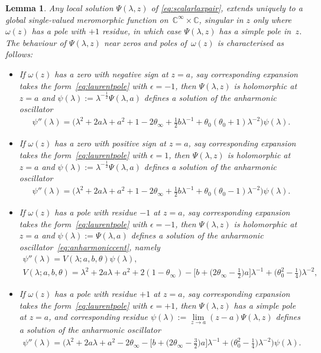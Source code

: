 \documentclass[pdftex]{sigma}
\numberwithin{equation}{section}
\newtheorem{lem}[thm]{Lemma}
\newcommand{\om}{\omega}
\begin{document}
\begin{lem}\label{lem:behavioursolutions}
Any local solution $\Psi(\lambda,z)$ of \eqref{eq:scalarlaxpair}, extends uniquely to a global single-valued meromorphic function on~$\mathbb{C}^\infty\times \mathbb{C}$, singular in $z$ only where $\om(z)$ has a pole with $+1$ residue, in which case $\Psi(\lambda,z)$ has a simple pole in~$z$. The behaviour of $\Psi(\lambda,z)$ near zeros and poles of~$\om(z)$ is characterised as follows:
	\begin{itemize}\itemsep=0pt
		\item 	If $\om(z)$ has a zero with negative sign at $z=a$, say corresponding expansion takes the form~\eqref{eq:laurentpole} with $\epsilon=-1$, then $\Psi(\lambda,z)$ is holomorphic at $z=a$ and	$\psi(\lambda):=\lambda^{-\frac{1}{2}}\Psi(\lambda,a)$
defines a solution of the anharmonic oscillator
		\begin{align*}
		\psi''(\lambda)=\big( \lambda^2+2a\lambda+a^2+1-2\theta_\infty+\tfrac{1}{2}b\lambda^{-1}+
		\theta_0(\theta_0+1)\lambda^{-2}\big)\psi(\lambda) .
		\end{align*}
		\item 	If $\om(z)$ has a zero with positive sign at $z=a$, say corresponding expansion takes the form~\eqref{eq:laurentpole}
		with $\epsilon=1$, then $\Psi(\lambda,z)$ is holomorphic at $z=a$ and $\psi(\lambda):=\lambda^{-\frac{1}{2}}\Psi(\lambda,a)$
	 defines a solution of the anharmonic oscillator
		\begin{align*}
		\psi''(\lambda)=\big( \lambda^2+2a\lambda+a^2+1-2\theta_\infty+\tfrac{1}{2}b\lambda^{-1}+
		\theta_0(\theta_0-1)\lambda^{-2} \big)\psi(\lambda) .
	\end{align*}
		\item 	If $\om(z)$ has a pole with residue $-1$ at $z=a$, say corresponding expansion takes the form~\eqref{eq:laurentpole} with $\epsilon=-1$, then $\Psi(\lambda,z)$ is holomorphic at $z=a$ and $\psi(\lambda):=\Psi(\lambda,a)$ defines a solution of the anharmonic oscillator~\eqref{eq:anharmoniccent}, namely
		\begin{gather*}
\psi''(\lambda) = V(\lambda;a,b,\theta)\psi(\lambda),\\
V(\lambda;a,b,\theta)=\lambda^2+2a\lambda+a^2+2(1-\theta_\infty)
-\big[b+\big(2\theta_\infty-\tfrac{1}{2}\big)a\big]\lambda^{-1}+\big(\theta_0^2-\tfrac{1}{4}\big)\lambda^{-2},
\end{gather*}
	\item 	If $\om(z)$ has a pole with residue $+1$ at $z=a$, say corresponding expansion takes the form~\eqref{eq:laurentpole} with $\epsilon=+1$, then $\Psi(\lambda,z)$ has a simple pole at $z=a$, and corresponding residue $\psi(\lambda):=\lim\limits_{z\rightarrow a}{(z-a)\Psi(\lambda,z)}$ defines a solution of the anharmonic oscillator
	\begin{gather*}
	\psi''(\lambda)=\big( \lambda^2+2a\lambda+a^2-2\theta_\infty-\big[b+\big(2\theta_\infty-\tfrac{3}{2}\big)a\big]\lambda^{-1}+
	\big(\theta_0^2-\tfrac{1}{4}\big)\lambda^{-2} \big)\psi(\lambda) .
	\end{gather*}
	\end{itemize}	
\end{lem}
\end{document}
